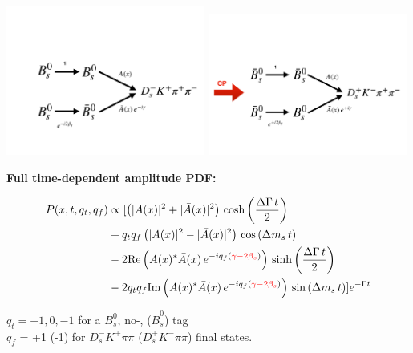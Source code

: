 \documentclass{beamer}
\begin{document}
\begin{frame}[plain]

	\centering
	\vspace{-1cm}
		\includegraphics[width=0.49\textwidth, height = !]{plots/Bs_gamma.pdf} 	
		\includegraphics[width=0.49\textwidth, height = !]{plots/Bs_gamma_CP.pdf} 	
		
		
	\small
		\textbf{Full time-dependent amplitude PDF:}
		\scriptsize
	\begin{block}{}
\begin{align*}
	P(x,t,q_t,q_f) &\propto  [
	 \left( \vert A(x) \vert^2 + \vert \bar A(x) \vert^2 \right) \, \text{cosh} \left( \frac{\Delta \Gamma \, t}{2}\right) \\
	 & + q_t q_f \left( \vert A(x) \vert^2 - \vert \bar A(x) \vert^2 \right) \, \text{cos} \left( \Delta m_s \, t \right)  \\
	 & -2 \text{Re}\left( A(x)^{*}  \bar A(x) \, e^{-i q_f (\textcolor{red}{\gamma - 2\beta_s})}  \right) \, \text{sinh} \left( \frac{\Delta \Gamma \, t}{2}\right)  \\
	 & -2 q_t q_f \text{Im}\left( A(x)^{*}  \bar A(x) \, e^{-i q_f (\textcolor{red}{\gamma - 2\beta_s})}  \right)\, \text{sin} \left( \Delta  m_s \, t \right)  ]  e^{- \Gamma t}
\end{align*}
	\end{block}

$q_t = +1,0,-1$ for a $B_s^{0}$, no-,  ($\bar B_s^{0}$) tag  \\ 
$q_f$ = +1 $ $(-1) for $D_s^{-} K^{+} \pi\pi$ ($D_s^{+} K^{-} \pi\pi$) final states. 
				
\end{frame}
\end{document}
